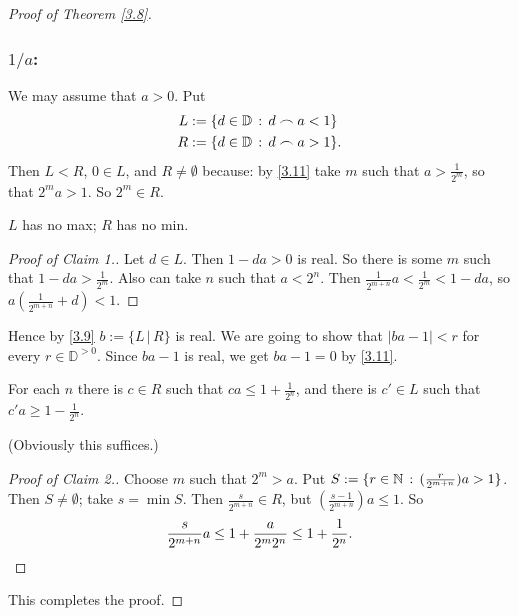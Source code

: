 \begin{proof}[Proof of Theorem \ref{3.8}]
\subsubsection*{$1/a$:} We may assume that $a>0$. Put
\begin{align*}
L &:= \{ d\in \mathbb{D} \,:\, d\frown a < 1 \} \\
R &:= \{ d\in \mathbb{D} \,:\, d\frown a > 1 \}.
\end{align*}
Then $L<R$, $0\in L$, and $R\ne\emptyset$ because: by \eqref{3.11} take $m$ such that $a>\frac1{2^m}$, so that $2^ma>1$. So $2^m\in R$.

$L$ has no max; $R$ has no min.

\begin{proof}[Proof of Claim 1.]
Let $d\in L$. Then $1-da>0$ is real. So there is some $m$ such that $1-da> \frac1{2^m}$. Also can take $n$ such that $a< 2^n$. Then $\frac{1}{2^{m+n}}a < \frac1{2^m} < 1-da$, so $a(\frac{1}{2^{m+n}} + d) < 1$.
\end{proof}

Hence by \eqref{3.9} $b:= \{L \,|\, R\}$ is real. We are going to show that $|ba-1|<r$ for every $r\in\mathbb{D}^{>0}$. Since $ba-1$ is real, we get $ba-1=0$ by \eqref{3.11}.

For each $n$ there is $c\in R$ such that $ca\le 1 + \frac1{2^n}$, and there is $c'\in L$ such that $c'a\ge 1  - \frac{1}{2^n}$. 

(Obviously this suffices.)

\begin{proof}[Proof of Claim 2.]
Choose $m$ such that $2^m>a$. Put $S := \{ r\in\mathbb{N} \,:\, (\frac{r}{2^{m+n}})a>1 \}$. Then $S\ne\emptyset$; take $s = \min S$. Then $\frac{s}{2^{m+n}}\in R$, but $(\frac{s-1}{2^{m+n}})a\le 1$. So
\[ \frac{s}{2^{m+n}} a \le 1 + \frac{a}{2^m2^n} \le 1 + \frac1{2^n}.\qedhere \]
\end{proof}
This completes the proof.
\end{proof}

%